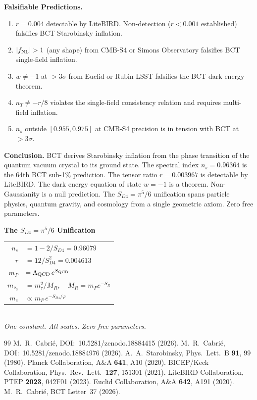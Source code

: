 \documentclass[aps,prl,twocolumn,superscriptaddress,floatfix]{revtex4-2}
\begin{document}
\medskip
\noindent\textbf{Falsifiable Predictions.}
\begin{enumerate}
\item[\textbf{1.}] $r = 0.004$ detectable by LiteBIRD. Non-detection
  ($r < 0.001$ established) falsifies BCT Starobinsky inflation.
\item[\textbf{2.}] $|f_{\rm NL}| > 1$ (any shape) from CMB-S4 or
  Simons Observatory falsifies BCT single-field inflation.
\item[\textbf{3.}] $w \neq -1$ at ${>}3\sigma$ from Euclid or
  Rubin LSST falsifies the BCT dark energy theorem.
\item[\textbf{4.}] $n_T \neq -r/8$ violates the single-field
  consistency relation and requires multi-field inflation.
\item[\textbf{5.}] $n_s$ outside $[0.955, 0.975]$ at CMB-S4
  precision is in tension with BCT at ${>}3\sigma$.
\end{enumerate}

\medskip
\noindent\textbf{Conclusion.}
BCT derives Starobinsky inflation from the phase transition of the
quantum vacuum crystal to its ground state. The spectral index
$n_s = 0.96364$ is the 64th BCT sub-1\% prediction. The tensor ratio
$r = 0.003967$ is detectable by LiteBIRD. The dark energy equation
of state $w = -1$ is a theorem. Non-Gaussianity is a null prediction.
The $S_{D4} = \pi^5/6$ unification spans particle physics, quantum
gravity, and cosmology from a single geometric axiom.
Zero free parameters.

\bigskip
\begin{center}
\begin{small}
\textbf{The $S_{D4} = \pi^5/6$ Unification}\\[4pt]
\begin{tabular}{rl}
$n_s$ & $= 1 - 2/S_{D4} = 0.96079$ \\
$r$ & $= 12/S_{D4}^2 = 0.004613$ \\
$m_P$ & $= \Lambda_{\rm QCD}\,e^{S_{\rm QCD}}$ \\
$m_{\nu_3}$ & $= m_\tau^2/M_R,\quad M_R = m_P e^{-S_R}$ \\
$m_e$ & $\propto m_P\,e^{-S_{D4}/\varphi}$ \\
\end{tabular}\\[6pt]
\textit{One constant. All scales. Zero free parameters.}
\end{small}
\end{center}

\begin{thebibliography}{99}
 M.~R.~Cabri\'e,
  DOI:~10.5281/zenodo.18884415 (2026).
 M.~R.~Cabri\'e,
  DOI:~10.5281/zenodo.18884976 (2026).
 A.~A.~Starobinsky,
  Phys.\ Lett.\ B \textbf{91}, 99 (1980).
 Planck Collaboration,
  A\&A \textbf{641}, A10 (2020).
 BICEP/Keck Collaboration,
  Phys.\ Rev.\ Lett.\ \textbf{127}, 151301 (2021).
 LiteBIRD Collaboration,
  PTEP \textbf{2023}, 042F01 (2023).
 Euclid Collaboration,
  A\&A \textbf{642}, A191 (2020).
 M.~R.~Cabri\'e, BCT Letter~37 (2026).
\end{thebibliography}
\end{document}
